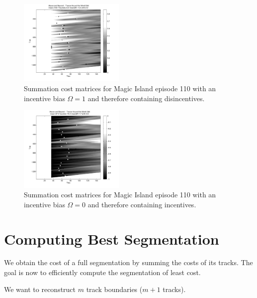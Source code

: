 \documentclass[twocolumn]{article}
\begin{document}
	
	
		\begin{figure}
			\centering
			\includegraphics[width=0.45\textwidth]{images/cmsumib0}
			\caption{Summation cost matrices for Magic Island episode 110 with an incentive bias $\Omega=1$ and therefore containing disincentives. }
			\label{fig:cmsumib1}
		\end{figure} 
		
		\begin{figure}
			\centering
			\includegraphics[width=0.45\textwidth]{images/cmsumib1}
			\caption{Summation cost matrices for Magic Island episode 110 with an incentive bias $\Omega=0$ and therefore containing incentives. }
			\label{fig:cmsumib1}
		\end{figure} 
		
		
	
	
	\section{Computing Best Segmentation}\label{best_cost}
	
	We obtain the cost of a full segmentation by summing the costs of its tracks. The goal is now to efficiently compute the segmentation of least cost.
	
	We want to reconstruct $m$ track boundaries ($m+1$ tracks).
	
\end{document}
